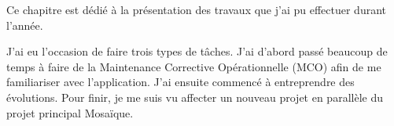 Ce chapitre est dédié à la présentation des travaux que j'ai pu effectuer durant l'année.

J'ai eu l'occasion de faire trois types de tâches. J'ai d'abord passé beaucoup de temps à faire de la Maintenance Corrective Opérationnelle (MCO) afin de me familiariser avec l'application. J'ai ensuite commencé à entreprendre des évolutions. Pour finir, je me suis vu affecter un nouveau projet en parallèle du projet principal Mosaïque.